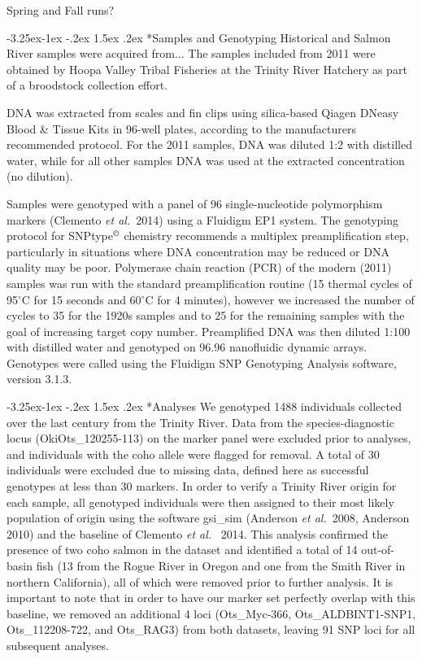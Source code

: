 \documentclass[twoside,10pt,twocolumn]{article}
\makeatletter
\newcommand{\etal}{{\em et al.}\ }
\renewcommand\subsection{\@startsection{subsection}{2}{\z@}%
                                     {-3.25ex\@plus -1ex \@minus -.2ex}%
                                     {1.5ex \@plus .2ex}%
                                     {\normalfont\normalsize\itshape}}
\makeatother
\begin{document}
Spring and Fall runs?

\subsection*{Samples and Genotyping}
Historical and Salmon River samples were acquired from...
The samples included from 2011 were obtained by Hoopa Valley Tribal Fisheries at the Trinity River Hatchery as part of a 
broodstock collection effort.

DNA was extracted from scales and fin clips using silica-based Qiagen DNeasy Blood \& Tissue Kits in 96-well plates, according 
to the manufacturers recommended protocol.  For the 2011 samples, DNA was diluted 1:2 with distilled water, while for all other 
samples DNA was used at the extracted concentration (no dilution). 

Samples were genotyped with a panel of 96 single-nucleotide polymorphism markers (Clemento \etal 2014) using a Fluidigm EP1 
system. The genotyping protocol for SNPtype$^\copyright$ chemistry recommends a multiplex preamplification step, particularly in 
situations where DNA concentration may be reduced or DNA quality may be poor.  Polymerase chain reaction (PCR) of the modern 
(2011) samples was run with the standard preamplification routine (15 thermal cycles of 95\ensuremath{^\circ}C for 15 seconds 
and 60\ensuremath{^\circ}C for 4 minutes), however we increased the number of cycles to 35 for the 1920s samples and to 25 for 
the remaining samples with the goal of increasing target copy number.  Preamplified DNA was then diluted 1:100 with distilled 
water and genotyped on 96.96 nanofluidic dynamic arrays. Genotypes were called using the Fluidigm SNP Genotyping Analysis 
software, version 3.1.3.


\subsection*{Analyses}
We genotyped 1488 individuals collected over the last century from the Trinity River. Data from the species-diagnostic locus 
(OkiOts\_120255-113) on the marker panel were excluded prior to analyses, and individuals with the coho allele were flagged for 
removal.  A total of 30 individuals were excluded due to missing data, defined here as successful genotypes at less than 30 
markers.  In order to verify a Trinity River origin for each sample, all genotyped individuals were then assigned to their most 
likely population of origin using the software gsi\_sim (Anderson \etal 2008, Anderson 2010) and the baseline of Clemento \etal 
2014.  This analysis confirmed the presence of two coho salmon in the dataset and identified a total of 14 out-of-basin fish (13 
from the Rogue River in Oregon and one from the Smith River in northern California), all of which were removed prior to further 
analysis. It is important to note that in order to have our marker set perfectly overlap with this baseline, we removed an 
additional 4 loci (Ots\_Myc-366, Ots\_ALDBINT1-SNP1,  Ots\_112208-722, and Ots\_RAG3) from both datasets, leaving 91 SNP loci 
for all subsequent analyses.
\end{document}
